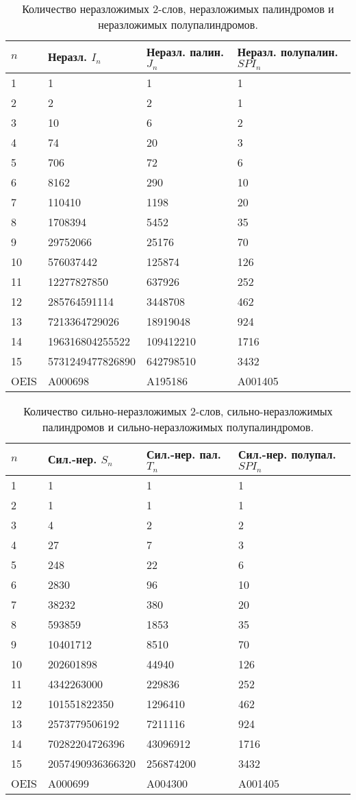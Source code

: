 \documentclass[a4paper,fleqn,12pt,top=0pt]{article}
\theoremstyle{plain}
\theoremstyle{definition}
\theoremstyle{remark}
\begin{document}
\begin{table}
    \centering
    \begin{tabular}{|l|l|l|l|}
\hline
$n$ & Неразл. $I_n$ & Неразл. палин. $J_n$ & Неразл. полупалин. $SPI_n$ \\
\hline
1 & 1 & 1 & 1 \\
2 & 2 & 2 & 1 \\
3 & 10 & 6 & 2 \\
4 & 74 & 20 & 3 \\
5 & 706 & 72 & 6 \\
6 & 8162 & 290 & 10 \\
7 & 110410 & 1198 & 20 \\
8 & 1708394 & 5452 & 35 \\
9 & 29752066 & 25176 & 70 \\
10 & 576037442 & 125874 & 126 \\
11 & 12277827850 & 637926 & 252 \\
12 & 285764591114 & 3448708 & 462 \\
13 & 7213364729026 & 18919048 & 924 \\
14 & 196316804255522 & 109412210 & 1716 \\
15 & 5731249477826890 & 642798510 & 3432 \\
\hline
OEIS\cite{oeis} & A000698 & A195186 & A001405 \\
\hline
    \end{tabular}
    \caption{Количество неразложимых 2-слов, неразложимых палиндромов и неразложимых полупалиндромов.}
\end{table}

\begin{table}
    \centering
    \begin{tabular}{|l|l|l|l|}
\hline
$n$ & Сил.-нер. $S_n$ & Сил.-нер. пал. $T_n$ & Сил.-нер. полупал. $SPI_n$ \\
\hline
1 & 1 & 1 & 1 \\
2 & 1 & 1 & 1 \\
3 & 4 & 2 & 2 \\
4 & 27 & 7 & 3 \\
5 & 248 & 22 & 6 \\
6 & 2830 & 96 & 10 \\
7 & 38232 & 380 & 20 \\
8 & 593859 & 1853 & 35 \\
9 & 10401712 & 8510 & 70 \\
10 & 202601898 & 44940 & 126 \\
11 & 4342263000 & 229836 & 252 \\
12 & 101551822350 & 1296410 & 462 \\
13 & 2573779506192 & 7211116 & 924 \\
14 & 70282204726396 & 43096912 & 1716 \\
15 & 2057490936366320 & 256874200 & 3432 \\
\hline
OEIS\cite{oeis} & A000699 & A004300 & A001405 \\
\hline
    \end{tabular}
    \caption{Количество сильно-неразложимых 2-слов, сильно-неразложимых палиндромов и сильно-неразложимых полупалиндромов.}
\end{table}
\end{document}
